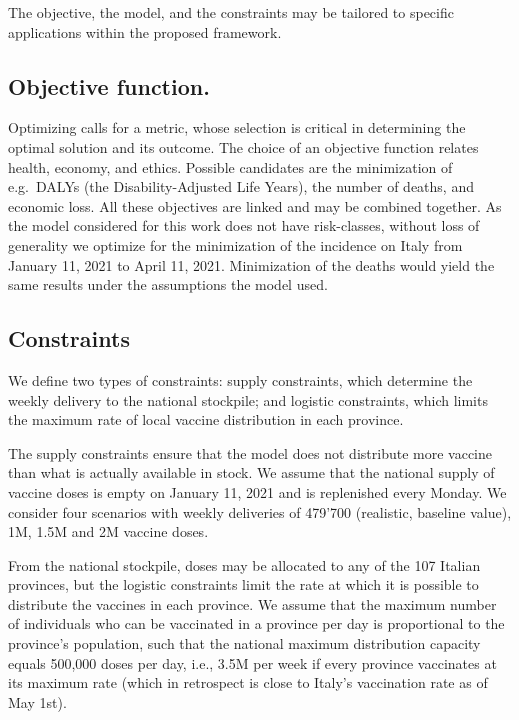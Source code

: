 The objective, the model, and the constraints may be tailored to specific applications within the proposed framework.

\subsection{Objective function.} Optimizing calls for a metric, whose selection is critical in determining the optimal solution and its outcome. The choice of an objective function relates health, economy, and ethics. Possible candidates are the minimization of e.g.~DALYs (the Disability-Adjusted Life Years), the number of deaths, and economic loss\cite{Du:ComparativeCosteffectivenessSARSCoV2:2021}. All these objectives are linked and may be combined together. As the model considered for this work does not have risk-classes, without loss of generality we optimize for the minimization of the incidence on Italy from January 11, 2021 to April 11, 2021. Minimization of the deaths would yield the same results under the assumptions the model used.

\subsection{Constraints} We define two types of constraints: supply constraints, which determine the weekly delivery to the national stockpile; and logistic constraints, which limits the maximum rate of local vaccine distribution in each province.

The supply constraints ensure that the model does not distribute more vaccine than what is actually available in stock. We assume that the national supply of vaccine doses is empty on January 11, 2021 and is replenished every Monday. We consider four scenarios with weekly deliveries of 479'700 (realistic, baseline value), 1M, 1.5M and 2M vaccine doses.

From the national stockpile, doses may be allocated to any of the 107 Italian provinces, but the logistic constraints limit the rate at which it is possible to distribute the vaccines in each province. We assume that the maximum number of individuals who can be vaccinated in a province per day is proportional to the province's population, such that the national maximum distribution capacity equals 500,000 doses per day, i.e., 3.5M per week if every province vaccinates at its maximum rate (which in retrospect is close to Italy's vaccination rate as of May 1st). 

